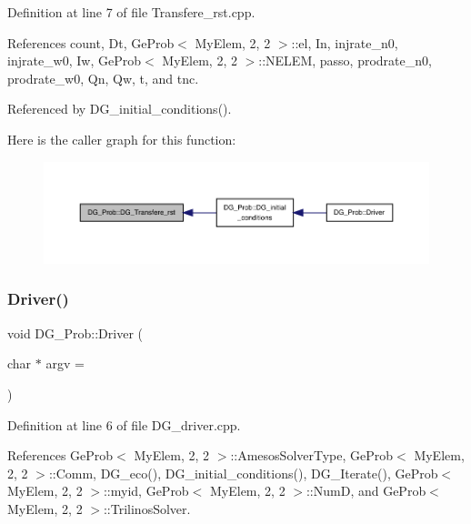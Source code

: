 Definition at line 7 of file Transfere\+\_\+rst.\+cpp.



References count, Dt, Ge\+Prob$<$ My\+Elem, 2, 2 $>$\+::el, In, injrate\+\_\+n0, injrate\+\_\+w0, Iw, Ge\+Prob$<$ My\+Elem, 2, 2 $>$\+::\+N\+E\+L\+EM, passo, prodrate\+\_\+n0, prodrate\+\_\+w0, Qn, Qw, t, and tnc.



Referenced by D\+G\+\_\+initial\+\_\+conditions().

Here is the caller graph for this function\+:
\nopagebreak
\begin{figure}[H]
\begin{center}
\leavevmode
\includegraphics[width=350pt]{classDG__Prob_a6ccc7a5921dd48f971da35e5632a0b7e_icgraph}
\end{center}
\end{figure}
\mbox{\label{classDG__Prob_a015d792341ee05b1b3eaef7990bf1e06}} 
\subsubsection{\texorpdfstring{Driver()}{Driver()}}
{\footnotesize\ttfamily void D\+G\+\_\+\+Prob\+::\+Driver (\begin{DoxyParamCaption}\item[{char $\ast$}]{argv = {} }\end{DoxyParamCaption})}



Definition at line 6 of file D\+G\+\_\+driver.\+cpp.



References Ge\+Prob$<$ My\+Elem, 2, 2 $>$\+::\+Amesos\+Solver\+Type, Ge\+Prob$<$ My\+Elem, 2, 2 $>$\+::\+Comm, D\+G\+\_\+eco(), D\+G\+\_\+initial\+\_\+conditions(), D\+G\+\_\+\+Iterate(), Ge\+Prob$<$ My\+Elem, 2, 2 $>$\+::myid, Ge\+Prob$<$ My\+Elem, 2, 2 $>$\+::\+NumD, and Ge\+Prob$<$ My\+Elem, 2, 2 $>$\+::\+Trilinos\+Solver.

